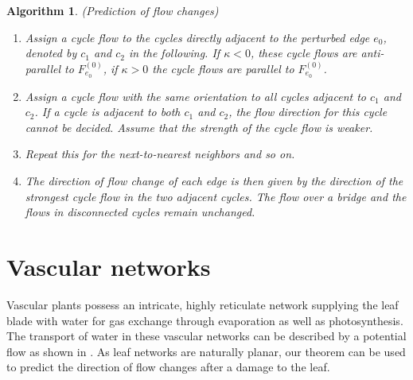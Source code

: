 \documentclass[10pt,aps,pra,twocolumn,superscriptaddress]{revtex4-1}
\newtheorem{alg}{Algorithm}
\begin{document}
\begin{alg}
\label{thm:alg1}
(Prediction of flow changes)
\begin{enumerate}
\item
Assign a cycle flow to the cycles directly adjacent to the perturbed edge $e_0$, denoted by $c_1$ and $c_2$ in the following. If $\kappa < 0$, these cycle flows are anti-parallel to $F^{(0)}_{e_0}$, if $\kappa > 0$ the cycle flows are parallel to $F^{(0)}_{e_0}$.
\item
Assign a cycle flow with the same orientation to all cycles adjacent to $c_1$ and $c_2$. If a cycle is adjacent to both $c_1$ and $c_2$, the flow direction for this cycle cannot be decided. Assume that the strength of the cycle flow is weaker. 
\item
Repeat this for the next-to-nearest neighbors and so on.
\item
The direction of flow change of each edge is then given by the direction of the strongest cycle flow in the two adjacent cycles. The flow over a bridge and the flows in disconnected cycles remain unchanged.
\end{enumerate}
\end{alg}

\section{Vascular networks}

Vascular plants possess an intricate, highly reticulate network 
supplying the leaf blade with water for gas exchange through
evaporation as well as photosynthesis.
The transport of water in these vascular networks can be described by a 
potential flow as shown in \cite{Kati10}.
As leaf networks are naturally planar, our theorem can be 
used to predict the direction of flow changes after a damage to the leaf.
\end{document}
